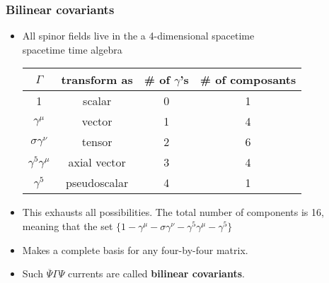 \label{theoremCode}
\begin{frame}\frametitle{Bilinear covariants}
\begin{itemize}
	\item 

All spinor fields live in the a 4-dimensional spacetime \\
spacetime time algebra
\begin{center}
\begin{tabular}{|c|c|c|c|}\hline
\textbf{$\Gamma$} & \textbf{transform as} & \textbf{\# of $\gamma$'s} & \textbf{\# of composants}\\\hline
1 & scalar & 0 & 1 \\\hline
$\gamma^\mu$ & vector & 1 & 4\\\hline
$\sigma \gamma^\nu$ & tensor & 2 & 6\\\hline
$\gamma^5 \gamma^\mu$ & axial vector & 3 & 4\\\hline
$\gamma^5$ & pseudoscalar & 4 & 1\\\hline
\end{tabular}
\end{center}
	\item 
This exhausts all possibilities. The total number of components is 16, meaning that the set $\{ 1-\gamma^\mu-\sigma \gamma^\nu-\gamma^5 \gamma^\mu-\gamma^5\}$
	\item 
Makes a complete basis for any four-by-four
matrix.
	\item 
Such $\overline{\Psi} \Gamma\Psi$ currents are called \textbf{bilinear covariants}.
\end{itemize}
\end{frame}
